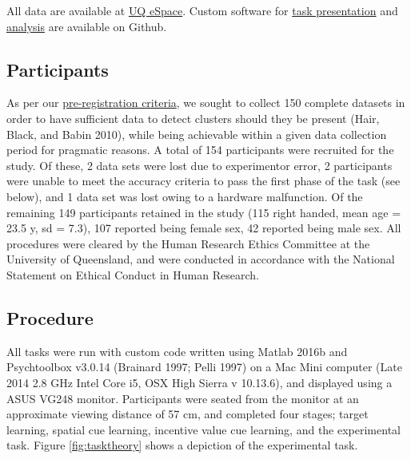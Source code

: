 \documentclass[11pt,halfline,a4paper,]{ouparticle}
\begin{document}
\label{sec:Method}

All data are available at \href{https://espace.library.uq.edu.au/view/UQ:d42fa1a}{UQ eSpace}. Custom software for \href{https://github.com/kel-github/imaging-cert-reward-att-task-code}{task presentation} and \href{https://github.com/kel-github/att-clust-write}{analysis} are available on Github.

\hypertarget{participants}{%
\subsection{Participants}\label{participants}}

\label{sec:Participants}

As per our \href{https://osf.io/erz4u/?view_only=68eaee13f7af49e2b2bae30d57570e5f}{pre-registration criteria}, we sought to collect 150 complete datasets in order to have sufficient data to detect clusters should they be present (Hair, Black, and Babin 2010), while being achievable within a given data collection period for pragmatic reasons. A total of 154 participants were recruited for the study. Of these, 2 data sets were lost due to experimentor error, 2 participants were unable to meet the accuracy criteria to pass the first phase of the task (see below), and 1 data set was lost owing to a hardware malfunction. Of the remaining 149 participants retained in the study (115 right handed, mean age = 23.5 y, sd = 7.3), 107 reported being female sex, 42 reported being male sex. All procedures were cleared by the Human Research Ethics Committee at the University of Queensland, and were conducted in accordance with the National Statement on Ethical Conduct in Human Research.

\hypertarget{procedure}{%
\subsection{Procedure}\label{procedure}}

\label{sec:Procedure}

All tasks were run with custom code written using Matlab 2016b and Psychtoolbox v3.0.14 (Brainard 1997; Pelli 1997) on a Mac Mini computer (Late 2014 2.8 GHz Intel Core i5, OSX High Sierra v 10.13.6), and displayed using a ASUS VG248 monitor. Participants were seated from the monitor at an approximate viewing distance of 57 cm, and completed four stages; target learning, spatial cue learning, incentive value cue learning, and the experimental task. Figure \ref{fig:tasktheory} shows a depiction of the experimental task.
\end{document}
